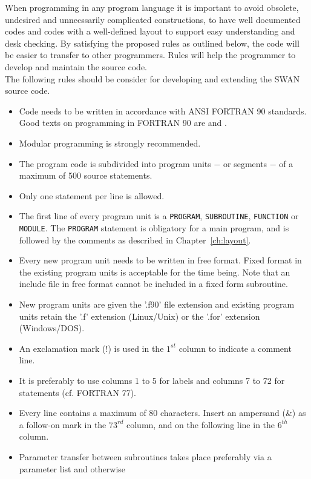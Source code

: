 \documentclass[12pt]{book}
\begin{document}
When programming in any program language it is important to avoid obsolete, undesired and unnecssarily
complicated constructions, to have well documented codes and codes with a well-defined layout to support
easy understanding and desk checking. By satisfying the proposed rules as outlined below, the code
will be easier to transfer to other programmers. Rules will help the programmer to develop and maintain
the source code.
\\[2ex]
\noindent
The following rules should be consider for developing and extending the SWAN source code.
\begin{itemize}
  \item Code needs to be written in accordance with ANSI FORTRAN 90 standards.
        Good texts on programming in FORTRAN 90 are \cite{Cha98} and \cite{Mor93S}.
  \item Modular programming is strongly recommended.
  \item The program code is subdivided into program units $-$ or segments $-$ of a maximum of 500 source statements.
  \item Only one statement per line is allowed.
  \item The first line of every program unit is a {\tt PROGRAM}, {\tt SUBROUTINE}, {\tt FUNCTION} or {\tt MODULE}.
        The {\tt PROGRAM} statement is obligatory for a main program, and is followed by the comments as described
        in Chapter~\ref{ch:layout}.
  \item Every new program unit needs to be written in free format. Fixed format in the existing program units
        is acceptable for the time being. Note that an include file in free format cannot be included in a
        fixed form subroutine.
  \item New program units are given the '.f90' file extension and existing program units retain the '.f' extension
        (Linux/Unix) or the '.for' extension (Windows/DOS).
  \item An exclamation mark (!) is used in the $1^{st}$ column to indicate a comment line.
  \item It is preferably to use columns 1 to 5 for labels and columns 7 to 72 for statements (cf. FORTRAN 77).
  \item Every line contains a maximum of 80 characters. Insert an ampersand (\&) as a follow-on mark in the
        $73^{rd}$ column, and on the following line in the $6^{th}$ column.
  \item Parameter transfer between subroutines takes place preferably via a parameter list and otherwise

\end{itemize}
\end{document}
